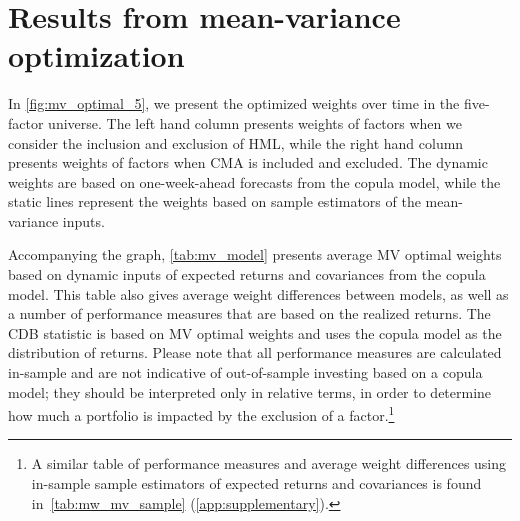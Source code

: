 
\section{Results from mean-variance optimization} %
\label{sec:mean_variance}

In \autoref{fig:mv_optimal_5}, we present the optimized weights over time in the five-factor universe. The left hand column presents weights of factors when we consider the inclusion and exclusion of HML, while the right hand column presents weights of factors when CMA is included and excluded. The dynamic weights are based on one-week-ahead forecasts from the copula model, while the static lines represent the weights based on sample estimators of the mean-variance inputs.

Accompanying the graph, \autoref{tab:mv_model} presents average MV optimal weights based on dynamic inputs of expected returns and covariances from the copula model. This table also gives average weight differences between models, as well as a number of performance measures that are based on the realized returns. The CDB statistic is based on MV optimal weights and uses the copula model as the distribution of returns. Please note that all performance measures are calculated in-sample and are not indicative of out-of-sample investing based on a copula model; they should be interpreted only in relative terms, in order to determine how much a portfolio is impacted by the exclusion of a factor.\footnote{A similar table of performance measures and average weight differences using in-sample sample estimators of expected returns and covariances is found in~\autoref{tab:mw_mv_sample} (\autoref{app:supplementary}).}

